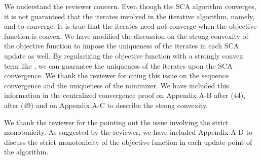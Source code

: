 \begin{enumerate}
\resp We understand the reviewer concern. Even though the \ac{SCA} algorithm converges, it is not guaranteed that the iterates involved in the iterative algorithm, namely,  and  to converge. It is true that the iterates need not converge when the objective function is convex. We have modified the discussion on the strong convexity of the objective function to impose the uniqueness of the iterates in each \ac{SCA} update as well. By regularizing the objective function with a strongly convex term like , we can guarantee the uniqueness of the iterates upon the \ac{SCA} convergence. We thank the reviewer for citing this issue on the sequence convergence and the uniqueness of the minimizer. We have included this information in the centralized convergence proof on Appendix A-B after (44), after (49) and on Appendix A-C to describe the strong convexity.

  

\resp We thank the reviewer for the pointing out the issue involving the strict monotonicity. As suggested by the reviewer, we have included Appendix A-D to discuss the strict monotonicity of the objective function in each update point of the algorithm. 


\end{enumerate}
